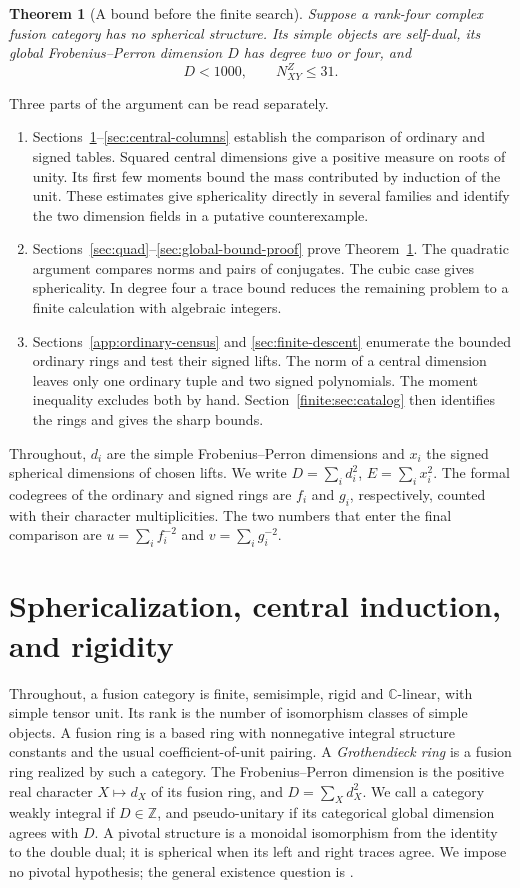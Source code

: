 \documentclass[11pt,a4paper]{article}
\newtheorem{theorem}{Theorem}[section]
\theoremstyle{definition}\newtheorem{definition}[theorem]{Definition}
\theoremstyle{remark}\newtheorem{remark}[theorem]{Remark}
\newcommand{\CC}{\mathbb C}
\newcommand{\ZZ}{\mathbb Z}
\numberwithin{equation}{section}
\begin{document}
\begin{theorem}[A bound before the finite search]\label{thm:uniform-global}
Suppose a rank-four complex fusion category has no spherical structure.
Its simple objects are self-dual, its global Frobenius--Perron dimension
$D$ has degree two or four, and
\[
 D<1000,\qquad N_{XY}^Z\le31 .
\]
\end{theorem}

Three parts of the argument can be read separately.
\begin{enumerate}
\item Sections~\ref{sec:core}--\ref{sec:central-columns} establish the
comparison of ordinary and signed tables. Squared central dimensions
give a positive measure on roots of unity. Its first few moments bound
the mass contributed by induction of the unit. These estimates give
sphericality directly in several families and identify the two dimension
fields in a putative counterexample.
\item Sections~\ref{sec:quad}--\ref{sec:global-bound-proof} prove
Theorem~\ref{thm:uniform-global}. The quadratic argument compares norms
and pairs of conjugates. The cubic case gives sphericality. In degree
four a trace bound reduces the remaining problem to a finite calculation
with algebraic integers.
\item Sections~\ref{app:ordinary-census} and \ref{sec:finite-descent}
enumerate the bounded ordinary rings and test their signed lifts. The
norm of a central dimension leaves only one ordinary tuple and two signed
polynomials. The moment inequality excludes both by hand. Section~\ref{finite:sec:catalog}
then identifies the rings and gives the sharp bounds.
\end{enumerate}

Throughout, $d_i$ are the simple Frobenius--Perron dimensions and $x_i$
the signed spherical dimensions of chosen lifts. We write
$D=\sum_i d_i^2$, $E=\sum_i x_i^2$. The formal codegrees of the ordinary
and signed rings are $f_i$ and $g_i$, respectively, counted with their
character multiplicities. The two numbers that enter the final comparison are
$u=\sum_i f_i^{-2}$ and $v=\sum_i g_i^{-2}$.
\section{Sphericalization, central induction, and rigidity}\label{sec:core}
Throughout, a fusion category is finite, semisimple, rigid and
$\CC$-linear, with simple tensor unit. Its rank is the number
of isomorphism classes of simple objects. A fusion ring is a based
ring with nonnegative integral structure constants and the usual
coefficient-of-unit pairing. A \emph{Grothendieck ring} is a fusion
ring realized by such a category. The Frobenius--Perron dimension is
the positive real character $X\mapsto d_X$ of its fusion ring,
and $D=\sum_Xd_X^2$. We call a category weakly integral if
$D\in\ZZ$, and pseudo-unitary if its categorical global dimension
agrees with $D$. A pivotal structure is a monoidal isomorphism from the identity to
the double dual; it is spherical when its left and right traces agree.
We impose no pivotal hypothesis; the general existence question is
\cite[Conjecture~2.8]{ENO}.
\end{document}
